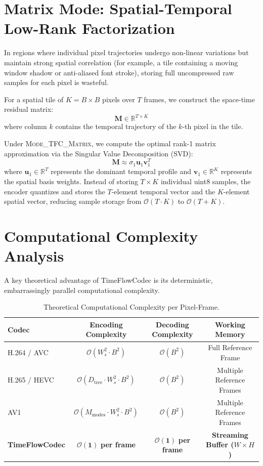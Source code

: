 \section{Matrix Mode: Spatial-Temporal Low-Rank Factorization}
In regions where individual pixel trajectories undergo non-linear variations but maintain strong spatial correlation (for example, a tile containing a moving window shadow or anti-aliased font stroke), storing full uncompressed raw samples for each pixel is wasteful.

For a spatial tile of $K = B \times B$ pixels over $T$ frames, we construct the space-time residual matrix:
\begin{equation}
    \mathbf{M} \in \mathbb{R}^{T \times K}
\end{equation}
where column $k$ contains the temporal trajectory of the $k$-th pixel in the tile.

Under \textsc{Mode\_TFC\_Matrix}, we compute the optimal rank-1 matrix approximation via the Singular Value Decomposition (SVD):
\begin{equation}
    \mathbf{M} \approx \sigma_1 \mathbf{u}_1 \mathbf{v}_1^T
\end{equation}
where $\mathbf{u}_1 \in \mathbb{R}^T$ represents the dominant temporal profile and $\mathbf{v}_1 \in \mathbb{R}^K$ represents the spatial basis weights. Instead of storing $T \times K$ individual uint8 samples, the encoder quantizes and stores the $T$-element temporal vector and the $K$-element spatial vector, reducing sample storage from $\mathcal{O}(T \cdot K)$ to $\mathcal{O}(T + K)$.

\section{Computational Complexity Analysis}
A key theoretical advantage of TimeFlowCodec is its deterministic, embarrassingly parallel computational complexity.

\begin{table}[h]
\centering
\caption{Theoretical Computational Complexity per Pixel-Frame.}
\label{tab:complexity}
\begin{tabular}{lccc}
\toprule
\textbf{Codec} & \textbf{Encoding Complexity} & \textbf{Decoding Complexity} & \textbf{Working Memory} \\
\midrule
H.264 / AVC & $\mathcal{O}(W_s^2 \cdot B^2)$ & $\mathcal{O}(B^2)$ & Full Reference Frame \\
H.265 / HEVC & $\mathcal{O}(D_{\text{tree}} \cdot W_s^2 \cdot B^2)$ & $\mathcal{O}(B^2)$ & Multiple Reference Frames \\
AV1 & $\mathcal{O}(M_{\text{modes}} \cdot W_s^2 \cdot B^2)$ & $\mathcal{O}(B^2)$ & Multiple Reference Frames \\
\textbf{TimeFlowCodec} & $\mathbf{\mathcal{O}(1)}$ \textbf{per frame} & $\mathbf{\mathcal{O}(1)}$ \textbf{per frame} & \textbf{Streaming Buffer ($W \times H$)} \\
\bottomrule
\end{tabular}
\end{table}

